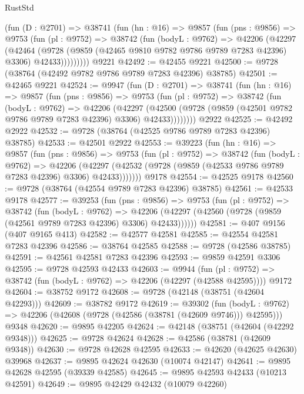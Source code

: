 \begin{lexlean}{RustStd}
\begin{coremodule}
      (fun (D : @2701) =>
      @38741
        (fun (hn : @16) =>
        @9857
          (fun (pns : @9856) =>
          @9753
            (fun (pl : @9752) =>
            @38742
              (fun (bodyL : @9762) =>
              @42206
                (@42297
                  (@42464
                    (@9728
                      (@9859 (@42465 @9810 @9782 @9786 @9789 @7283 @42396) @3306)
                      @42433)))))))))
    @9221
@42492 := @42455 @9221
@42500 := @9728 (@38764 (@42492 @9782 @9786 @9789 @7283 @42396) @38785)
@42501 := @42465 @9221
@42524 := @9947
    (fun (D : @2701) =>
    @38741
      (fun (hn : @16) =>
      @9857
        (fun (pns : @9856) =>
        @9753
          (fun (pl : @9752) =>
          @38742
            (fun (bodyL : @9762) =>
            @42206
              (@42297
                (@42500 (@9728 (@9859 (@42501 @9782 @9786 @9789 @7283 @42396) @3306) @42433))))))))
    @2922
@42525 := @42492 @2922
@42532 := @9728 (@38764 (@42525 @9786 @9789 @7283 @42396) @38785)
@42533 := @42501 @2922
@42553 := @39223
    (fun (hn : @16) =>
    @9857
      (fun (pns : @9856) =>
      @9753
        (fun (pl : @9752) =>
        @38742
          (fun (bodyL : @9762) =>
          @42206
            (@42297 (@42532 (@9728 (@9859 (@42533 @9786 @9789 @7283 @42396) @3306) @42433)))))))
    @9178
@42554 := @42525 @9178
@42560 := @9728 (@38764 (@42554 @9789 @7283 @42396) @38785)
@42561 := @42533 @9178
@42577 := @39253
    (fun (pns : @9856) =>
    @9753
      (fun (pl : @9752) =>
      @38742
        (fun (bodyL : @9762) =>
        @42206 (@42297 (@42560 (@9728 (@9859 (@42561 @9789 @7283 @42396) @3306) @42433))))))
@42581 := @407 @9156 (@407 @9165 @413)
@42582 := @42577 @42581
@42585 := @42554 @42581 @7283 @42396
@42586 := @38764 @42585
@42588 := @9728 (@42586 @38785)
@42591 := @42561 @42581 @7283 @42396
@42593 := @9859 @42591 @3306
@42595 := @9728 @42593 @42433
@42603 := @9944
    (fun (pl : @9752) => @38742 (fun (bodyL : @9762) => @42206 (@42297 (@42588 @42595))))
    @9172
@42604 := @38752 @9172
@42608 := @9728 (@42148 (@38751 (@42604 @42293)))
@42609 := @38782 @9172
@42619 := @39302
    (fun (bodyL : @9762) => @42206 (@42608 (@9728 (@42586 (@38781 (@42609 @9746))) @42595)))
    @9348
@42620 := @9895 @42205
@42624 := @42148 (@38751 (@42604 (@42292 @9348)))
@42625 := @9728 @42624
@42628 := @42586 (@38781 (@42609 @9348))
@42630 := @9728 @42628 @42595
@42633 := @42620 (@42625 @42630) @39968
@42637 := @9895 @42624 @42630 (@10074 @42147)
@42641 := @9895 @42628 @42595 (@39339 @42585)
@42645 := @9895 @42593 @42433 (@10213 @42591)
@42649 := @9895 @42429 @42432 (@10079 @42260)

\end{coremodule}
\end{lexlean}
